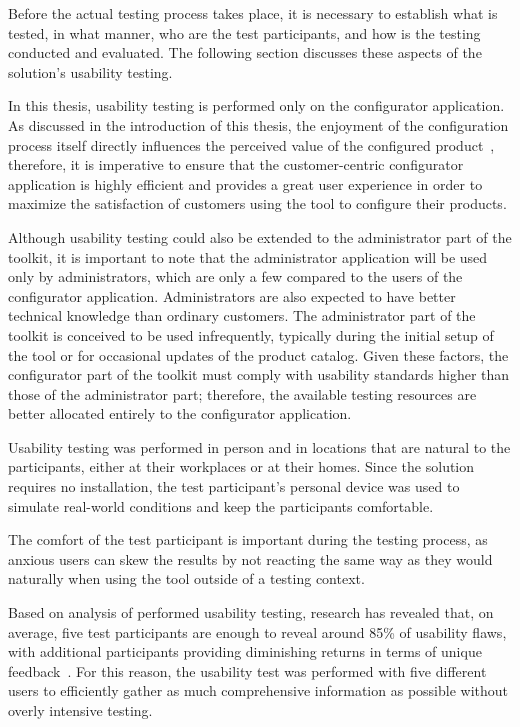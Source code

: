 Before the actual testing process takes place, it is necessary to establish what is tested, in what manner, who are the test participants, and how is the testing conducted and evaluated. The following section discusses these aspects of the solution's usability testing.

In this thesis, usability testing is performed only on the configurator application. As discussed in the introduction of this thesis, the enjoyment of the configuration process itself directly influences the perceived value of the configured product~\cite{Franke2010}, therefore, it is imperative to ensure that the customer-centric configurator application is highly efficient and provides a great user experience in order to maximize the satisfaction of customers using the tool to configure their products.

Although usability testing could also be extended to the administrator part of the toolkit, it is important to note that the administrator application will be used only by administrators, which are only a few compared to the users of the configurator application. Administrators are also expected to have better technical knowledge than ordinary customers. The administrator part of the toolkit is conceived to be used infrequently, typically during the initial setup of the tool or for occasional updates of the product catalog. Given these factors, the configurator part of the toolkit must comply with usability standards higher than those of the administrator part; therefore, the available testing resources are better allocated entirely to the configurator application.

Usability testing was performed in person and in locations that are natural to the participants, either at their workplaces or at their homes. Since the solution requires no installation, the test participant's personal device was used to simulate real-world conditions and keep the participants comfortable.

The comfort of the test participant is important during the testing process, as anxious users can skew the results by not reacting the same way as they would naturally when using the tool outside of a testing context.~\cite{Nielsen1994}

Based on analysis of performed usability testing, research has revealed that, on average, five test participants are enough to reveal around 85\% of usability flaws, with additional participants providing diminishing returns in terms of unique feedback~\cite{Nielsen2000}. For this reason, the usability test was performed with five different users to efficiently gather as much comprehensive information as possible without overly intensive testing.  

